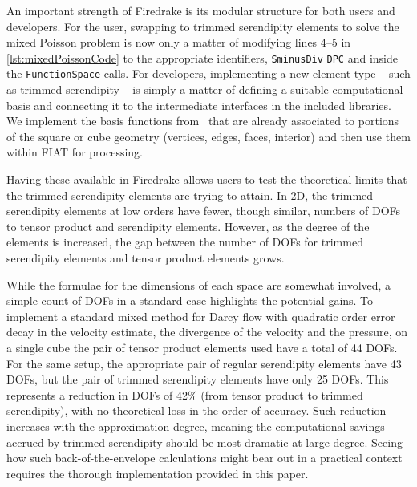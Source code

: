 \documentclass[format=acmsmall,screen,timestamp=false,a4paper]{acmart}
\newcommand\lm[1]{\textbf{\textcolor[rgb]{1,0,0.5}{[Lawrence: #1]}}}
\begin{document}
  
  
An important strength of Firedrake is its modular structure for both users and developers.
For the user, swapping to trimmed serendipity elements to solve the mixed Poisson problem is now only a matter of modifying lines 4--5 in \cref{lst:mixedPoissonCode} to the appropriate identifiers, \texttt{SminusDiv} \texttt{DPC} and inside the \texttt{FunctionSpace} calls.
   For developers, implementing a new element type -- such as trimmed serendipity -- is simply a matter of defining a suitable computational basis and connecting it to the intermediate interfaces in the included libraries.  We implement the basis functions from~\cite{gillette2019computational} that are already associated to portions of the square or cube geometry (vertices, edges, faces, interior) and then use them within FIAT for processing.
   
   Having these available in Firedrake allows users to test the theoretical limits that the trimmed serendipity elements are trying to attain.  In 2D, the trimmed serendipity elements at low orders have fewer, though similar, numbers of DOFs to tensor product and serendipity elements.  However, as the degree of the elements is increased, the gap between the number of DOFs for trimmed serendipity elements and tensor product elements grows.  
   
   While the formulae for the dimensions of each space are somewhat involved, a simple count of DOFs in a standard case highlights the potential gains.
   To implement a standard mixed method for Darcy flow with quadratic order error decay in the velocity estimate, the divergence of the velocity and the pressure, on a single cube the pair of tensor product elements used have a total of 44 DOFs.
   For the same setup, the appropriate pair of regular serendipity elements have 43 DOFs, but the pair of trimmed serendipity elements have only 25 DOFs. 
   This represents a reduction in DOFs of 42\% (from tensor product to trimmed serendipity), with no theoretical loss in the order of accuracy.
   Such reduction increases with the approximation degree, meaning the computational savings accrued by trimmed serendipity should be most dramatic at large degree.
   Seeing how such back-of-the-envelope calculations might bear out in a practical context requires the thorough implementation provided in this paper. %
   
\end{document}
